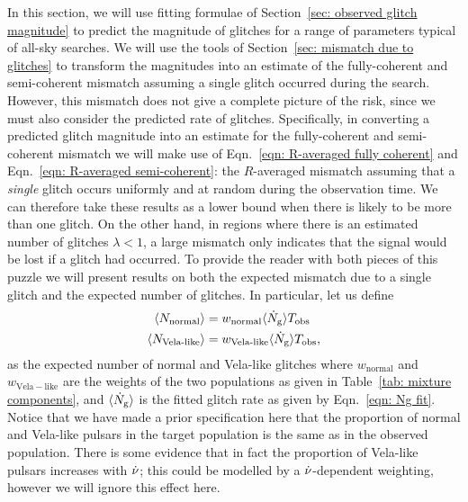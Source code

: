\documentclass[../full_thesis/full_thesis.tex]{subfiles}
\begin{document}
In this section, we will use fitting formulae of Section~\ref{sec: observed glitch
magnitude} to predict the magnitude of glitches for a range of parameters
typical of all-sky searches. We will use the tools of Section~\ref{sec: mismatch
due to glitches} to transform the magnitudes into an estimate of the
fully-coherent and semi-coherent mismatch assuming a single glitch occurred
during the search. However, this mismatch does not give a complete picture of
the risk, since we must also consider the predicted rate of glitches.
Specifically, in converting a predicted glitch magnitude into an estimate for
the fully-coherent and semi-coherent mismatch we will make use of
Eqn.~\eqref{eqn: R-averaged fully coherent} and Eqn.~\eqref{eqn: R-averaged
semi-coherent}: the $R$-averaged mismatch assuming that a \emph{single} glitch
occurs uniformly and at random during the observation time. We can therefore
take these results as a lower bound when there is likely to be more than one
glitch. On the other hand, in regions where there is an estimated number of
glitches $\lambda < 1$, a large mismatch only indicates that the signal would
be lost if a glitch had occurred. To provide the reader with both pieces of
this puzzle we will present results on both the expected mismatch due to a
single glitch and the expected number of glitches. In particular, let us define
\begin{align}
\begin{split}
\langle N_{\textrm{normal}} \rangle & = w_\textrm{normal}\langle \dot{N}_{\textrm{g}}\rangle T_{\mathrm{obs}} \\
\langle N_{\textrm{Vela-like}} \rangle & = w_\textrm{Vela-like}\langle \dot{N}_{\textrm{g}}\rangle T_{\mathrm{obs}},
\end{split}
\label{eqn: N}
\end{align}
as the expected number of normal and Vela-like glitches where $w_\mathrm{normal}$
and $w_\mathrm{Vela-like}$ are the weights of the two populations as given in
Table~\ref{tab: mixture components}, and $\langle \dot{N}_{\textrm{g}}\rangle$ is the fitted glitch rate as
given by Eqn.~\eqref{eqn: Ng fit}. Notice that we have made a prior specification
here that the proportion of normal and Vela-like pulsars in the target population
is the same as in the observed population. There is some evidence that in
fact the proportion of Vela-like pulsars increases with $\dot{\nu}$; this could
be modelled by a $\dot{\nu}$-dependent weighting, however we will ignore this
effect here.
\end{document}
